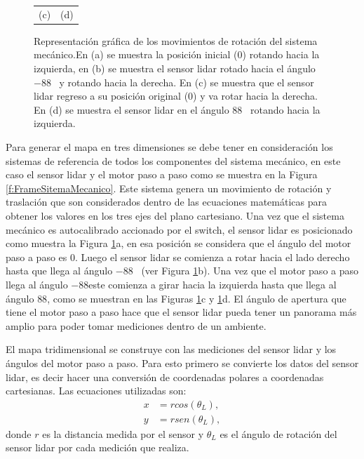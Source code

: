 \begin{figure}
\begin{tabular}{cc}
        (c)&(d)
    \end{tabular}
  \captionsetup{font=footnotesize}
    \caption{\label{f:Rot3D}Representación gráfica de los movimientos de rotación del sistema 
    mecánico.En (a) se muestra la posición inicial (0\grad) rotando hacia la izquierda, en (b) se 
    muestra el sensor lidar rotado hacia el ángulo $-88$\grad~ y rotando hacia la derecha. En (c) 
    se muestra que el sensor lidar regreso a su posición original (0\grad) y va rotar hacia la 
    derecha. En (d) se muestra el sensor lidar en el ángulo $88$\grad~ rotando hacia la izquierda.}
\end{figure}

Para generar el mapa en tres dimensiones se debe tener en consideración los sistemas de referencia 
de todos los componentes del sistema mecánico, en este caso el sensor lidar y el motor paso a paso
como se muestra en la Figura \ref{f:FrameSitemaMecanico}. Este sistema genera un movimiento de rotación
y traslación que son considerados dentro de las ecuaciones matemáticas para obtener los valores en los 
tres ejes del plano cartesiano. Una vez que el sistema mecánico es autocalibrado accionado por el 
switch, el sensor lidar es posicionado como muestra la Figura \ref{f:Rot3D}a, en esa posición se 
considera que el ángulo del motor paso a paso es 0\grad. Luego el sensor lidar se comienza a rotar 
hacia el lado derecho hasta que llega al ángulo $-88$\grad~ (ver Figura \ref{f:Rot3D}b). Una vez que
el motor paso a paso llega al ángulo $-88$\grad este comienza a girar hacia la izquierda hasta 
que llega al ángulo $88$\grad, como se muestran en las Figuras \ref{f:Rot3D}c y \ref{f:Rot3D}d. El 
ángulo de apertura que tiene el motor paso a paso hace que el sensor lidar pueda tener un 
panorama más amplio para poder tomar mediciones dentro de un ambiente.

El mapa tridimensional se construye con las mediciones del sensor lidar y los ángulos del motor paso
a paso. Para esto primero se convierte los datos del sensor lidar, es decir hacer una conversión 
de coordenadas polares a coordenadas cartesianas. Las ecuaciones utilizadas son:
\begin{align*}
	x &= rcos(\theta_{L}), \\
	y &= rsen(\theta_{L}),
\end{align*}
donde $r$ es la distancia medida por el sensor y $\theta_{L}$ es el ángulo de rotación del sensor 
lidar por cada medición que realiza.

